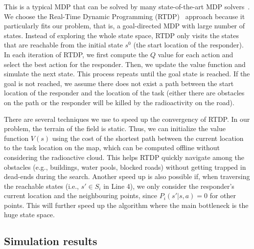 This is a typical MDP that can be solved by many state-of-the-art
MDP solvers~\cite{?}. We choose the Real-Time Dynamic Programming
(RTDP)~\cite{?} approach because it particularly fits  our problem,
that is, a goal-directed MDP with large number of states. Instead
of exploring the whole state space, RTDP only visits the states
that are reachable from the initial state $s^0$ (the start location
of the responder). In each iteration of RTDP, we first compute the
$Q$ value for each action and select the best action for the
responder. Then, we update the value function and simulate the next
state. This process repeats until the goal state is reached. If the
goal is not reached, we assume there does not exist a path between
the start location of the responder and the location of the task
(either there are obstacles on the path or the responder will be
killed by the radioactivity on the road).

There are several techniques we use to speed up the convergency of
RTDP. In our problem, the terrain of the field is static. Thus, we
can initialize the value function $V(s)$ using the cost of the
shortest path between the current location to the task location on
the map, which can be computed offline without considering the
radioactive cloud. This helps RTDP quickly navigate among the
obstacles (e.g., buildings, water pools, blocked roads) without
getting trapped in dead-ends during the search. Another speed up is
also possible if, when traversing the reachable states (i.e.,
$s'\in S_i$ in Line 4), we only consider the responder's current
location and the neighbouring points, since $P_i(s'|s,a) = 0$ for
other points. This will further speed up the algorithm where the
main bottleneck is the huge state space.

\subsection{Simulation results}

